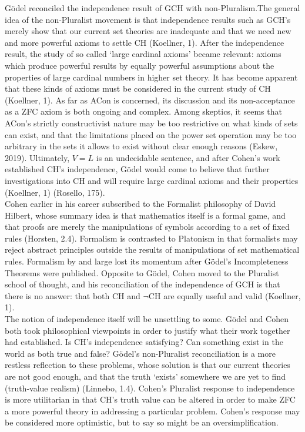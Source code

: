 \documentclass[10pt,letterpaper]{amsart}
\numberwithin{equation}{section}
\theoremstyle{plain}
\theoremstyle{definition}
\numberwithin{equation}{section}
\begin{document}
Gödel reconciled the independence result of GCH with non-Pluralism.\;The general idea of the non-Pluralist movement is that independence results such as GCH's merely show that our current set theories are inadequate and that we need new and more powerful axioms to settle CH (Koellner, 1). After the independence result, the study of so called `large cardinal axioms' became relevant: axioms which produce powerful results by equally powerful assumptions about the properties of large cardinal numbers in higher set theory. It has become apparent that these kinds of axioms must be considered in the current study of CH (Koellner, 1). As far as ACon is concerned, its discussion and its non-acceptance as a ZFC axiom is both ongoing and complex. Among skeptics, it seems that ACon's strictly constructivist nature may be too restrictive on what kinds of sets can exist, and that the limitations placed on the power set operation may be too arbitrary in the sets it allows to exist without clear enough reasons (Eskew, 2019). Ultimately, $V=L$ is an undecidable sentence, and after Cohen's work established CH's independence, Gödel would come to believe that further investigations into CH and will require large cardinal axioms and their properties (Koellner, 1) (Rosello, 175). \\

Cohen earlier in his career subscribed to the Formalist philosophy of David Hilbert, whose summary idea is that mathematics itself is a formal game, and that proofs are merely the manipulations of symbols according to a set of fixed rules (Horsten, 2.4). Formalism is contrasted to Platonism in that formalists may reject abstract principles outside the results of manipulations of set mathematical rules. Formalism by and large lost its momentum after Gödel's Incompleteness Theorems were published. Opposite to Gödel, Cohen moved to the Pluralist school of thought, and his reconciliation of the independence of GCH is that there is no answer: that both CH and $\neg$CH are equally useful and valid (Koellner, 1).\\

The notion of independence itself will be unsettling to some. Gödel and Cohen both took philosophical viewpoints in order to justify what their work together had established. Is CH's independence satisfying? Can something exist in the world as both true and false? Gödel's non-Pluralist reconciliation is a more restless reflection to these problems, whose solution is that our current theories are not good enough, and that the truth `exists' somewhere we are yet to find (truth-value realism) (Linnebo, 1.4). Cohen's Pluralist response to independence is more utilitarian in that CH's truth value can be altered in order to make ZFC a more powerful theory in addressing a particular problem. Cohen's response may be considered more optimistic, but to say so might be an oversimplification. \\
\end{document}
